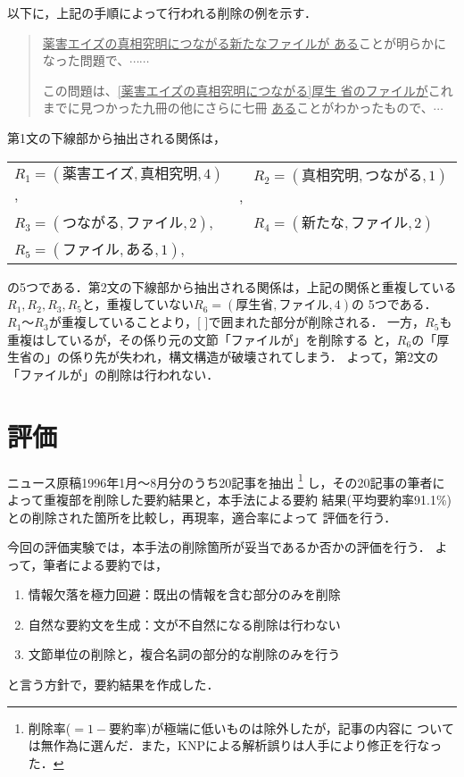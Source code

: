 以下に，上記の手順によって行われる削除の例を示す．
\newpage
\begin{quote}\label{rei:rei15}
 \hspace*{-1em}{\bf 例15：}\par
 \hspace*{1em}\underline{薬害エイズの真相究明につながる新たなファイルが
 ある}ことが明らかになった問題で、$\cdots\cdots$

\hspace*{1em}この問題は、\underline{[薬害エイズの真相究明につながる]厚生
 省のファイルが}これまでに見つかった九冊の他にさらに七冊
 \underline{ある}ことがわかったもので、$\cdots$
\end{quote}
第1文の下線部から抽出される関係は，
\begin{center}
\begin{tabular}{ll}
 $R_{1}=(薬害エイズ, 真相究明,4)$, & \ \ $R_{2}=(真相究明,つながる,1)$, \\
 $R_{3}=(つながる,ファイル,2)$,    & \ \ $R_{4}=(新たな,ファイル,2)$\\
 $R_{5}=(ファイル,ある,1)$,    & \\
\end{tabular}
\end{center}
の5つである．第2文の下線部から抽出される関係は，上記の関係と重複している
$R_{1},R_{2},R_{3},R_{5}$と，重複していない$R_{6}=(厚生省,ファイル,4)$の
5つである．
$R_{1}〜R_{3}$が重複していることより，[ ]で囲まれた部分が削除される．
一方，$R_{5}$も重複はしているが，その係り元の文節「ファイルが」を削除する
と，$R_{6}$の「厚生省の」の係り先が失われ，構文構造が破壊されてしまう．
よって，第2文の「ファイルが」の削除は行われない．

\section{評価} \label{hyouka}
ニュース原稿1996年1月〜8月分のうち20記事を抽出
\footnote{削除率($=1-要約率$)が極端に低いものは除外したが，記事の内容に
ついては無作為に選んだ．また，KNPによる解析誤りは人手により修正を行なっ
た．}
し，その20記事の筆者によって重複部を削除した要約結果と，本手法による要約
結果(平均要約率91.1\%)との削除された箇所を比較し，再現率，適合率によって
評価を行う．

今回の評価実験では，本手法の削除箇所が妥当であるか否かの評価を行う．
よって，筆者による要約では，
\begin{enumerate}
 \setlength{\itemsep}{-1.5mm}
\item 情報欠落を極力回避：既出の情報を含む部分のみを削除
\item 自然な要約文を生成：文が不自然になる削除は行わない
\item 文節単位の削除と，複合名詞の部分的な削除のみを行う
\end{enumerate}
と言う方針で，要約結果を作成した．


